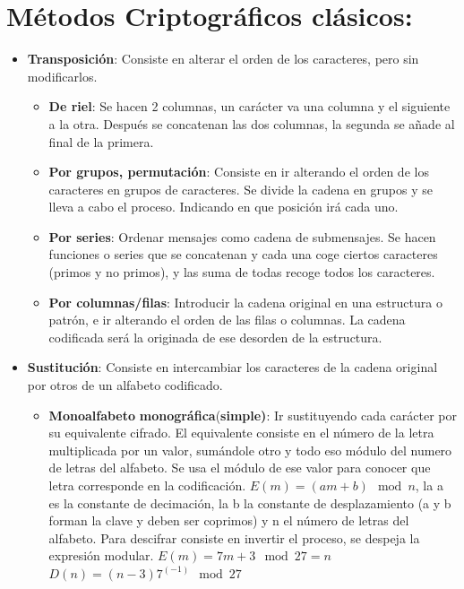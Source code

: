 \documentclass[12pt, twoside, openright]{report} %
\begin{document}
  \pagebreak
  \section{Métodos Criptográficos clásicos:}
  

  \begin{itemize}
  \item \textbf{Transposición}: Consiste en alterar el orden de los
    caracteres, pero sin modificarlos.
    

    \begin{itemize}
    \item \textbf{De riel}: Se hacen 2 columnas, un carácter va una columna
      y el siguiente a la otra. Después se concatenan las dos columnas,
      la segunda se añade al final de la primera.
      
    \item \textbf{Por grupos, permutación}: Consiste en ir alterando el
      orden de los caracteres en grupos de caracteres. Se divide la
      cadena en grupos y se lleva a cabo el proceso. Indicando en que
      posición irá cada uno.
      
    \item \textbf{Por series}: Ordenar mensajes como cadena de submensajes.
      Se hacen funciones o series que se concatenan y cada una coge
      ciertos caracteres (primos y no primos), y las suma de todas
      recoge todos los caracteres.
      
    \item \textbf{Por columnas/filas}: Introducir la cadena original en una
      estructura o patrón, e ir alterando el orden de las filas o
      columnas. La cadena codificada será la originada de ese desorden
      de la estructura.
      
    \end{itemize}
  \item \textbf{Sustitución}: Consiste en intercambiar los caracteres de la
    cadena original por otros de un alfabeto codificado.
    

    \begin{itemize}
    \item \textbf{Monoalfabeto} \textbf{monográfica}(\textbf{simple)}: Ir
      sustituyendo cada carácter por su equivalente cifrado. El
      equivalente consiste en el número de la letra multiplicada por un
      valor, sumándole otro y todo eso módulo del numero de letras del
      alfabeto. Se usa el módulo de ese valor para conocer que letra
      corresponde en la codificación. $E(m)=(am+b) \mod n$, la a es la
      constante de decimación, la b la constante de desplazamiento (a y
      b forman la clave y deben ser coprimos) y n el número de letras
      del alfabeto. Para descifrar consiste en invertir el proceso, se
      despeja la expresión modular. $E(m)=7m+3 \mod 27=n$
      $D(n)=(n-3)7^{(-1)} \mod 27$
      


\end{itemize}
\end{itemize}
\end{document}
